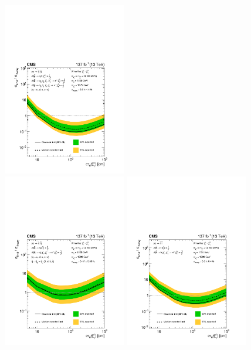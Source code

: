  \begin{figure}[htbp]
    \centering
    \includegraphics[width=0.48\textwidth]{figures/MT2_2019/Figure_022-a}\\
    \includegraphics[width=0.48\textwidth]{figures/MT2_2019/Figure_022-b}
    \includegraphics[width=0.48\textwidth]{figures/MT2_2019/Figure_022-c}

\end{figure}
